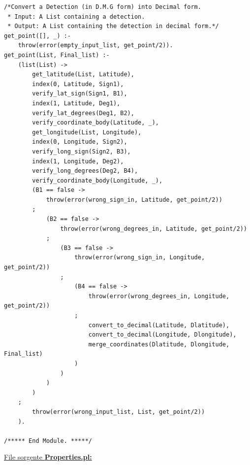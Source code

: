 \documentclass{article}
\begin{document}
\begin{lstlisting}
/*Convert a Detection (in D.M.G form) into Decimal form.
 * Input: A List containing a detection.
 * Output: A List containing the detection in decimal form.*/
get_point([], _) :-
    throw(error(empty_input_list, get_point/2)).
get_point(List, Final_list) :-
    (list(List) -> 
        get_latitude(List, Latitude),
        index(0, Latitude, Sign1),
        verify_lat_sign(Sign1, B1),
        index(1, Latitude, Deg1),
        verify_lat_degrees(Deg1, B2),
        verify_coordinate_body(Latitude, _),
        get_longitude(List, Longitude),
        index(0, Longitude, Sign2),
        verify_long_sign(Sign2, B3),
        index(1, Longitude, Deg2),
        verify_long_degrees(Deg2, B4),
        verify_coordinate_body(Longitude, _),
        (B1 == false ->
            throw(error(wrong_sign_in, Latitude, get_point/2))
        ;
        	(B2 == false -> 
        		throw(error(wrong_degrees_in, Latitude, get_point/2))
        	;
        		(B3 == false ->
                	throw(error(wrong_sign_in, Longitude, get_point/2))
            	;
            		(B4 == false ->
            			throw(error(wrong_degrees_in, Longitude, get_point/2))
            		;
            			convert_to_decimal(Latitude, Dlatitude),
                		convert_to_decimal(Longitude, Dlongitude),
                		merge_coordinates(Dlatitude, Dlongitude, Final_list)
            		)
            	)
        	)
        )
    ;
        throw(error(wrong_input_list, List, get_point/2))
    ).
    
/***** End Module. *****/
\end{lstlisting}
\underline{File sorgente \textbf{Properties.pl:}}
\lstset{language=Prolog}
\end{document}
